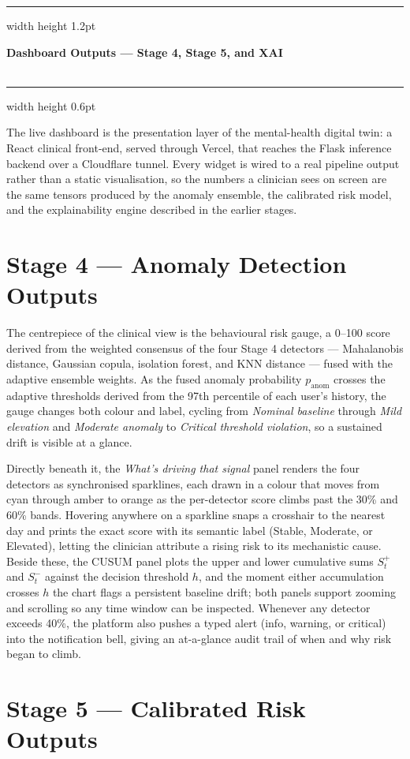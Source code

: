 \documentclass[10.5pt,a4paper]{article}
\newcommand{\stagesep}{{\color{headerblue}\hrule width \linewidth height 1.2pt}\vspace{0.4em}}
\newcommand{\stagetitle}[2]{%
  \vspace{0.4em}
  {\color{headerblue}\Huge\bfseries #1}\\[0.15em]
  {\large\color{midgray}#2}\\[0.3em]
  {\color{headerblue}\hrule width \linewidth height 0.6pt}\vspace{0.6em}}
\begin{document}
\stagesep
\stagetitle{Dashboard Outputs --- Stage 4, Stage 5, and XAI}{}

The live dashboard is the presentation layer of the mental-health digital twin: a React clinical front-end, served through Vercel, that reaches the Flask inference backend over a Cloudflare tunnel. Every widget is wired to a real pipeline output rather than a static visualisation, so the numbers a clinician sees on screen are the same tensors produced by the anomaly ensemble, the calibrated risk model, and the explainability engine described in the earlier stages.

\section*{Stage 4 --- Anomaly Detection Outputs}

The centrepiece of the clinical view is the behavioural risk gauge, a 0--100 score derived from the weighted consensus of the four Stage 4 detectors --- Mahalanobis distance, Gaussian copula, isolation forest, and KNN distance --- fused with the adaptive ensemble weights. As the fused anomaly probability $p_{\text{anom}}$ crosses the adaptive thresholds derived from the 97th percentile of each user's history, the gauge changes both colour and label, cycling from \emph{Nominal baseline} through \emph{Mild elevation} and \emph{Moderate anomaly} to \emph{Critical threshold violation}, so a sustained drift is visible at a glance.

Directly beneath it, the \emph{What's driving that signal} panel renders the four detectors as synchronised sparklines, each drawn in a colour that moves from cyan through amber to orange as the per-detector score climbs past the 30\% and 60\% bands. Hovering anywhere on a sparkline snaps a crosshair to the nearest day and prints the exact score with its semantic label (Stable, Moderate, or Elevated), letting the clinician attribute a rising risk to its mechanistic cause. Beside these, the CUSUM panel plots the upper and lower cumulative sums $S_t^{+}$ and $S_t^{-}$ against the decision threshold $h$, and the moment either accumulation crosses $h$ the chart flags a persistent baseline drift; both panels support zooming and scrolling so any time window can be inspected. Whenever any detector exceeds 40\%, the platform also pushes a typed alert (info, warning, or critical) into the notification bell, giving an at-a-glance audit trail of when and why risk began to climb.

\section*{Stage 5 --- Calibrated Risk Outputs}
\end{document}
